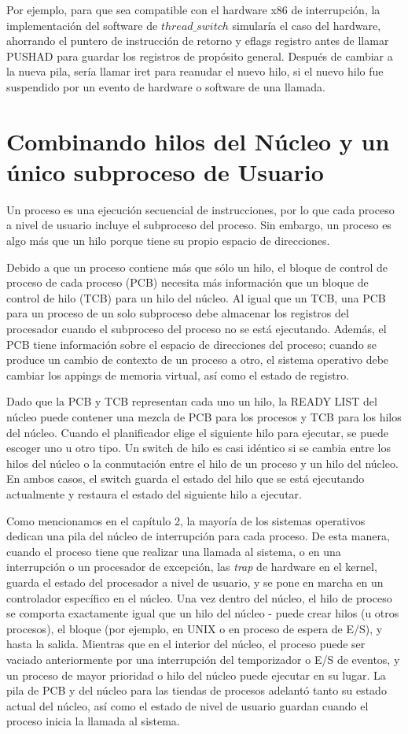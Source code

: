 \documentclass[10pt]{book}
\begin{document}
Por ejemplo, para que sea compatible con el hardware x86 de interrupción, la implementación del software de $thread\_ switch$ simularía el caso del hardware, ahorrando el puntero de instrucción de retorno y eflags registro antes de llamar PUSHAD para guardar los registros de propósito general. Después de cambiar a la nueva pila, sería llamar iret para reanudar el nuevo hilo, si el nuevo hilo fue suspendido por un evento de hardware o software de una llamada.

\section{Combinando hilos del Núcleo y un único subproceso de Usuario}
Un proceso es una ejecución secuencial de instrucciones, por lo que cada proceso a nivel de usuario incluye el subproceso del proceso. Sin embargo, un proceso es algo más que un hilo porque tiene su propio espacio de direcciones.

Debido a que un proceso contiene más que sólo un hilo, el bloque de control de proceso de cada proceso (PCB) necesita más información que un bloque de control de hilo (TCB) para un hilo del núcleo. Al igual que un TCB, una PCB para un proceso de un solo subproceso debe almacenar los registros del procesador cuando el subproceso del proceso no se está ejecutando. Además, el PCB tiene información sobre el espacio de direcciones del proceso; cuando se produce un cambio de contexto de un proceso a otro, el sistema operativo debe cambiar los appings de memoria virtual, así como el estado de registro.

Dado que la PCB y TCB representan cada uno un hilo, la READY LIST del núcleo puede contener una mezcla de PCB para los procesos y TCB para los hilos del núcleo. Cuando el planificador elige el siguiente hilo para ejecutar, se puede escoger uno u otro tipo. Un switch de hilo es casi idéntico si se cambia entre los hilos del núcleo o la conmutación entre el hilo de un proceso y un hilo del núcleo. En ambos casos, el switch guarda el estado del hilo que se está ejecutando actualmente y restaura el estado del siguiente hilo a ejecutar.

Como mencionamos en el capítulo 2, la mayoría de los sistemas operativos dedican una pila del núcleo de interrupción para cada proceso. De esta manera, cuando el proceso tiene que realizar una llamada al sistema, o en una interrupción o un procesador de excepción, las \textit{trap} de hardware en el kernel, guarda el estado del procesador a nivel de usuario, y se pone en marcha en un controlador específico en el núcleo. Una vez dentro del núcleo, el hilo de proceso se comporta exactamente igual que un hilo del núcleo - puede crear hilos (u otros procesos), el bloque (por ejemplo, en UNIX o en proceso de espera de E/S), y hasta la salida. Mientras que en el interior del núcleo, el proceso puede ser vaciado anteriormente por una interrupción del temporizador o E/S de eventos, y un proceso de mayor prioridad o hilo del núcleo puede ejecutar en su lugar. La pila de PCB y del núcleo para las tiendas de procesos adelantó tanto su estado actual del núcleo, así como el estado de nivel de usuario guardan cuando el proceso inicia la llamada al sistema.
\end{document}
